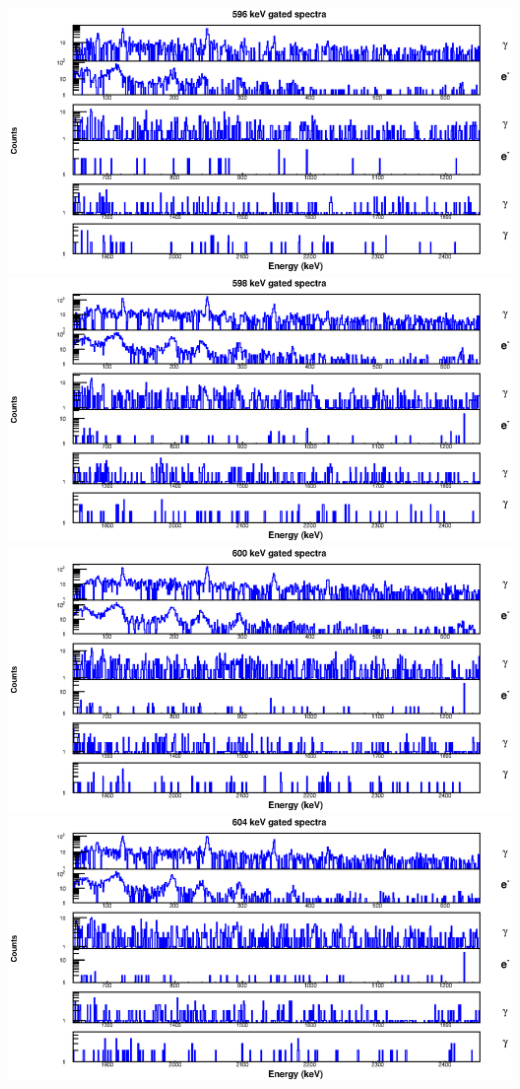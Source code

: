 \begin{landscape}
\includegraphics[scale=1.2]{154Gd_Appendix/596_combined.eps}
\includegraphics[scale=1.2]{154Gd_Appendix/598_combined.eps}
\includegraphics[scale=1.2]{154Gd_Appendix/600_combined.eps}
\includegraphics[scale=1.2]{154Gd_Appendix/604_combined.eps}

\end{landscape}
